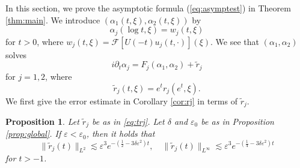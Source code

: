 \documentclass[11pt,a4paper,twosides]{amsart}
\theoremstyle{plain}
\newtheorem{proposition}[theorem]{Proposition}
\theoremstyle{remark}
\numberwithin{equation}{section}
\theoremstyle{definition}
\newcommand{\1}{{\bf 1}_{\{|x| < |t|\}}}
\renewcommand{\epsilon}{\varepsilon}
\renewcommand{\tilde}{\widetilde}
\begin{document}
In this section, we prove the asymptotic formula 
(\ref{eq:asymptest}) in Theorem \ref{thm:main}. 
We introduce $(\alpha_1(t,\xi), \alpha_2(t,\xi))$ by
  \begin{equation}
    \alpha_j(\log t,\xi) = w_j(t,\xi)
  \end{equation}
  for $t > 0$, where $w_j(t,\xi)={{\mathcal F}}[U(-t)u_j(t,\cdot)](\xi)$. 
  We see that $(\alpha_1, \alpha_2)$ solves
  \begin{equation}
    i\partial_t\alpha_j = F_j(\alpha_1, \alpha_2) + \widetilde{r}_j
  \end{equation}
  for $j = 1, 2$, where
  \begin{equation}\label{eq:trj}
    \widetilde{r}_j(t, \xi) = e^tr_j(e^t, \xi).
  \end{equation}
We first give the error estimate in Corollary \ref{cor:rj}
in terms of $\tilde{r}_j$.
\begin{proposition}\label{prop:rj}
  Let $\tilde{r}_j$ be as in  \eqref{eq:trj}.
  Let $\delta$ and $\epsilon_0$ be as in Proposition \ref{prop:global}.
  If $\epsilon < \epsilon_0$, then it holds that
  \begin{equation}\label{eq:esttrj}
    \|\tilde{r}_j(t)\|_{L^2} \lesssim \epsilon^3e^{-(\frac12-3\delta\epsilon^2)t}, \quad
    \|\tilde{r}_j(t)\|_{L^\infty} \lesssim \epsilon^3e^{-(\frac14-3\delta\epsilon^2)t}
  \end{equation}
for $t > -1$.
\end{proposition}
\end{document}
